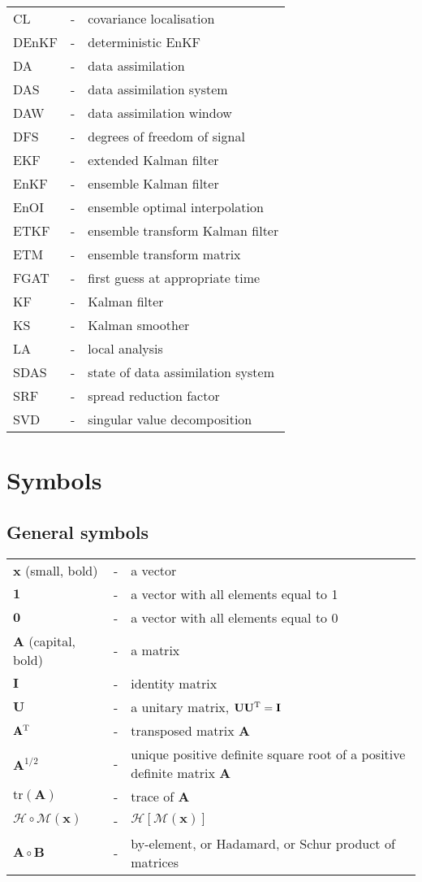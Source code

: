 \documentclass[11pt]{report}
\newcommand{\mb} {\mathbf}
\newcommand{\T}{^{\tiny \mathrm T}}
\begin{document}
\begin{tabular}{lll}
  CL &-& covariance localisation \\
  DEnKF &-& deterministic EnKF \\
  DA &-& data assimilation \\
  DAS &-& data assimilation system \\
  DAW &-& data assimilation window \\
  DFS &-& degrees of freedom of signal \\
  EKF &-& extended Kalman filter \\
  EnKF &-& ensemble Kalman filter \\
  EnOI &-& ensemble optimal interpolation \\
  ETKF &-& ensemble transform Kalman filter \\
  ETM &-& ensemble transform matrix \\
  FGAT &-& first guess at appropriate time \\
  KF &-& Kalman filter \\
  KS &-& Kalman smoother \\
  LA &-& local analysis \\
  SDAS &-& state of data assimilation system \\
  SRF &-& spread reduction factor \\
  SVD &-& singular value decomposition \\
\end{tabular}

\clearpage

\chapter*{Symbols}

\section*{General symbols}
\begin{tabular}{lll}
  $\mb x$ (small, bold) &-& a vector \\
  $\mb 1$ &-& a vector with all elements equal to 1 \\
  $\mb 0$ &-& a vector with all elements equal to 0 \\
  $\mb A$ (capital, bold) &-& a matrix \\
  $\mb I$ &-& identity matrix \\
  $\mb U$ &-& a unitary matrix, $\mb U \mb U\T = \mb I$ \\
  $\mb A\T$ &-& transposed matrix $\mb A$ \\
  $\mb A^{1/2}$ &-& unique positive definite square root of a positive definite matrix $\mb A$ \\
  $\mathrm{tr}(\mb A)$ &-& trace of $\mb A$ \\
  $\mathcal H \circ \mathcal M(\mb x)$ &-& $\mathcal H \left[ \mathcal M (\mb x) \right]$ \\
  $\mb A \circ \mb B$ &-& by-element, or Hadamard, or Schur product of matrices
\end{tabular}
\end{document}
